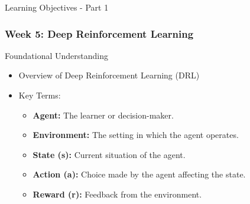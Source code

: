 \documentclass[aspectratio=169]{beamer}
\begin{document}
\begin{frame}[fragile]{Learning Objectives - Part 1}
    \frametitle{Week 5: Deep Reinforcement Learning}
    
    \begin{block}{Foundational Understanding}
        \begin{itemize}
            \item Overview of Deep Reinforcement Learning (DRL)
            \item Key Terms:
                \begin{itemize}
                    \item \textbf{Agent:} The learner or decision-maker.
                    \item \textbf{Environment:} The setting in which the agent operates.
                    \item \textbf{State (s):} Current situation of the agent.
                    \item \textbf{Action (a):} Choice made by the agent affecting the state.
                    \item \textbf{Reward (r):} Feedback from the environment.
                \end{itemize}
        \end{itemize}
    \end{block}
\end{frame}
\end{document}
